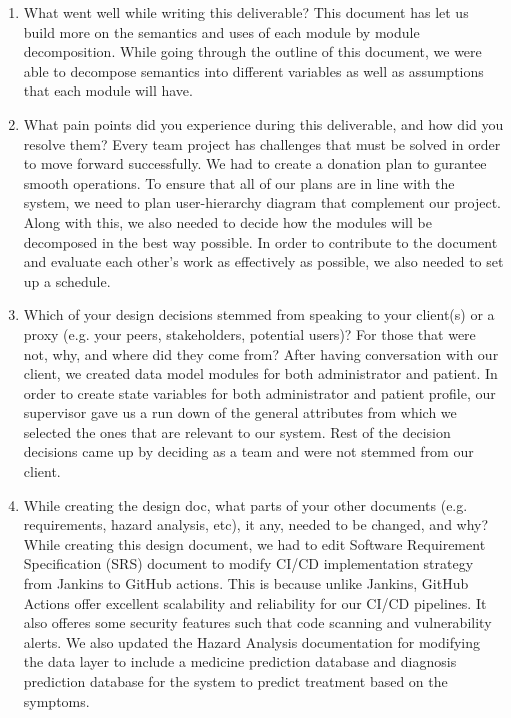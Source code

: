 \documentclass[12pt, titlepage]{article}
\begin{document}
\begin{enumerate}
  \item What went well while writing this deliverable?
  This document has let us build more on the semantics and uses of each module by module decomposition. While going through the outline of this document, we were able to decompose semantics into different variables as well as assumptions that each module will have.

  \item What pain points did you experience during this deliverable, and how did you resolve them?
  Every team project has challenges that must be solved in order to move forward successfully. We had to create a donation plan to gurantee smooth operations. To ensure that all of our plans are in line with the system,
  we need to plan user-hierarchy diagram that complement our project. Along with this, we also needed to decide how the modules will be decomposed in the best way possible. In order to contribute to the document and evaluate each other’s work as effectively as possible, we also needed to set up a schedule. 

  \item Which of your design decisions stemmed from speaking to your client(s)
  or a proxy (e.g. your peers, stakeholders, potential users)? For those that
  were not, why, and where did they come from?
  After having conversation with our client, we created data model modules for both administrator and patient. In order to create state variables for both administrator and patient profile, our supervisor gave us a run down of the general attributes from which we selected the ones that are relevant to our system. Rest of the decision decisions came up by deciding as a team and were not stemmed from our client.  

  \item While creating the design doc, what parts of your other documents (e.g.
  requirements, hazard analysis, etc), it any, needed to be changed, and why?
  While creating this design document, we had to edit Software Requirement Specification (SRS) document to modify CI/CD implementation strategy from Jankins to GitHub actions. This is because unlike Jankins, GitHub Actions offer excellent scalability and reliability for our CI/CD pipelines. It also offeres some security features such that code scanning and vulnerability alerts. We also updated the Hazard Analysis documentation for modifying the data layer to include a medicine prediction database and diagnosis prediction database for the system to predict treatment based on the symptoms.  


\end{enumerate}
\end{document}
